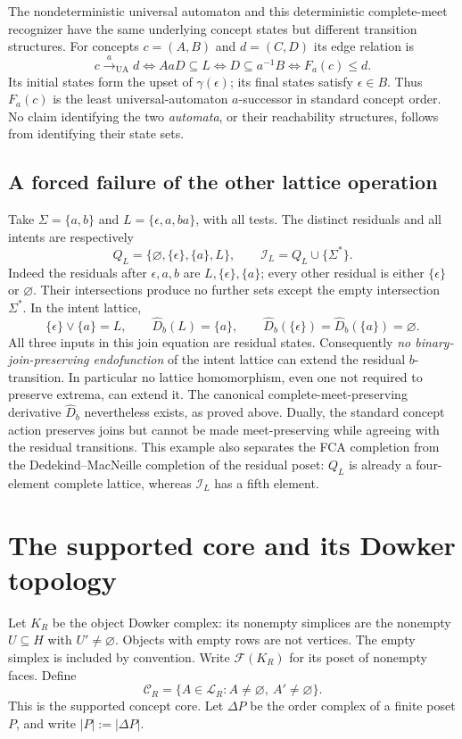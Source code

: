 \documentclass[11pt]{article}
\theoremstyle{remark}
\begin{document}
The nondeterministic universal automaton and this deterministic
complete-meet recognizer have the same underlying concept states but
different transition structures.
For concepts $c=(A,B)$ and $d=(C,D)$ its edge relation is
\[
 c\xrightarrow{a}_{\mathrm{UA}}d
 \Longleftrightarrow AaD\subseteq L
 \Longleftrightarrow D\subseteq a^{-1}B
 \Longleftrightarrow F_a(c)\leq d.
 
\]
Its initial states form the upset of $\gamma(\epsilon)$; its final states
satisfy $\epsilon\in B$. Thus $F_a(c)$ is the least universal-automaton
$a$-successor in standard concept order. No claim identifying the two
\emph{automata}, or their reachability structures, follows from identifying
their state sets.

\subsection{A forced failure of the other lattice operation}
Take $\Sigma=\{a,b\}$ and $L=\{\epsilon,a,ba\}$, with all tests.
The distinct residuals and all intents are respectively
\[
 Q_L=\{\varnothing,\{\epsilon\},\{a\},L\},\qquad
 \mathcal I_L=Q_L\cup\{\Sigma^*\}.
\]
Indeed the residuals after $\epsilon,a,b$ are $L,\{\epsilon\},\{a\}$;
every other residual is either $\{\epsilon\}$ or $\varnothing$. Their
intersections produce no further sets except the empty intersection
$\Sigma^*$. In the intent lattice,
\[
 \{\epsilon\}\vee\{a\}=L,\qquad
 \widehat D_b(L)=\{a\},\qquad \widehat D_b(\{\epsilon\})=\widehat D_b(\{a\})=\varnothing.
\]
All three inputs in this join equation are residual states. Consequently
\emph{no binary-join-preserving endofunction} of the intent lattice can
extend the residual $b$-transition. In particular no lattice homomorphism,
even one not required to preserve extrema, can extend it. The canonical
complete-meet-preserving derivative $\widehat D_b$ nevertheless exists, as proved
above. Dually, the standard concept action preserves joins but cannot be
made meet-preserving while agreeing with the residual transitions.
This example also separates the FCA completion from the
Dedekind--MacNeille completion of the residual poset: $Q_L$ is already a
four-element complete lattice, whereas $\mathcal I_L$ has a fifth element.

\section{The supported core and its Dowker topology}

Let $K_R$ be the object Dowker complex: its nonempty simplices are the
nonempty $U\subseteq H$ with $U'\ne\varnothing$. Objects with empty rows
are not vertices. The empty simplex is included by convention. Write
$\mathcal F(K_R)$ for its poset of nonempty faces. Define
\[
 \mathcal C_R=
 \{A\in\mathcal L_R:A\ne\varnothing,\ A'\ne\varnothing\}.
\]
This is the supported concept core. Let $\Delta P$ be the order complex
of a finite poset $P$, and write $|P|:=|\Delta P|$.
\end{document}
